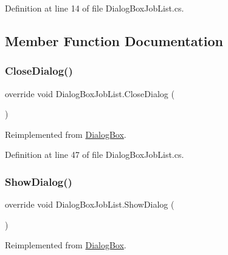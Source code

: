 Definition at line 14 of file Dialog\+Box\+Job\+List.\+cs.



\subsection{Member Function Documentation}
\mbox{\label{class_dialog_box_job_list_aa3d5098f6bab14d057a54df2dbd045da}} 
\subsubsection{\texorpdfstring{Close\+Dialog()}{CloseDialog()}}
{\footnotesize\ttfamily override void Dialog\+Box\+Job\+List.\+Close\+Dialog (\begin{DoxyParamCaption}{ }\end{DoxyParamCaption})\hspace{0.3cm}{\ttfamily [virtual]}}



Reimplemented from \hyperlink{class_dialog_box_ad4f408b78d5e109525c229ad34f5a447}{Dialog\+Box}.



Definition at line 47 of file Dialog\+Box\+Job\+List.\+cs.

\mbox{\label{class_dialog_box_job_list_a09f09a252b810e63c0f2ee221bef2685}} 
\subsubsection{\texorpdfstring{Show\+Dialog()}{ShowDialog()}}
{\footnotesize\ttfamily override void Dialog\+Box\+Job\+List.\+Show\+Dialog (\begin{DoxyParamCaption}{ }\end{DoxyParamCaption})\hspace{0.3cm}{\ttfamily [virtual]}}



Reimplemented from \hyperlink{class_dialog_box_a971a6e45f6ca26863c3910680521b0ac}{Dialog\+Box}.



